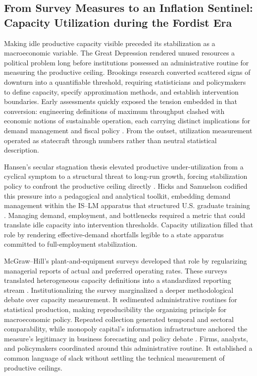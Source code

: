 \documentclass[11pt]{article}
\begin{document}
\subsection{From Survey Measures to an Inflation Sentinel: Capacity Utilization during the Fordist Era}
\label{subsec:fordist_survey_statecraft}

Making idle productive capacity visible preceded its stabilization as a macroeconomic variable. The Great Depression rendered unused resources a political problem long before institutions possessed an administrative routine for measuring the productive ceiling. Brookings research converted scattered signs of downturn into a quantifiable threshold, requiring statisticians and policymakers to define capacity, specify approximation methods, and establish intervention boundaries. Early assessments quickly exposed the tension embedded in that conversion: engineering definitions of maximum throughput clashed with economic notions of sustainable operation, each carrying distinct implications for demand management and fiscal policy \citep{Burns1954, KleinDavid1958}. From the outset, utilization measurement operated as statecraft through numbers rather than neutral statistical description.

Hansen’s secular stagnation thesis elevated productive under-utilization from a cyclical symptom to a structural threat to long-run growth, forcing stabilization policy to confront the productive ceiling directly \citep{Hansen1936, Hansen1941, Barber1987}. Hicks and Samuelson codified this pressure into a pedagogical and analytical toolkit, embedding demand management within the IS--LM apparatus that structured U.S. graduate training \citep{Hicks1937, Samuelson1947, Samuelson1948}. Managing demand, employment, and bottlenecks required a metric that could translate idle capacity into intervention thresholds. Capacity utilization filled that role by rendering effective-demand shortfalls legible to a state apparatus committed to full-employment stabilization.

McGraw--Hill’s plant-and-equipment surveys developed that role by regularizing managerial reports of actual and preferred operating rates. These surveys translated heterogeneous capacity definitions into a standardized reporting stream \citep{Butler1958, Phillips1963}. Institutionalizing the survey marginalized a deeper methodological debate over capacity measurement. It sedimented administrative routines for statistical production, making reproducibility the organizing principle for macroeconomic policy. Repeated collection generated temporal and sectoral comparability, while monopoly capital’s information infrastructure anchored the measure’s legitimacy in business forecasting and policy debate \citep{BaranSweezy1988, Munroe2007}. Firms, analysts, and policymakers coordinated around this administrative routine. It established a common language of slack without settling the technical measurement of productive ceilings.
\end{document}
